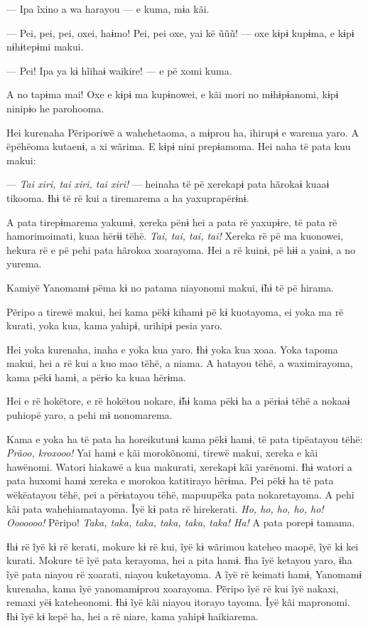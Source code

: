 --- Ipa ĩxino a wa harayou --- e kuma, mɨa kãi. 

--- Pei, pei, pei, oxei, haɨmo! Pei, pei oxe, yai kë ũũũ! --- oxe kɨpɨ
kupɨma, e kɨpɨ nɨhɨtepɨmi makui. 

--- Pei! Ipa ya kɨ hĩihaɨ waikire! --- e pë xomi kuma. 

A no tapɨma mai! Oxe e kɨpɨ ma kupɨnowei, e kãi mori no mɨhɨpɨanomi,
kɨpɨ ninipɨo he parohooma. 

Hei kurenaha Pẽriporiwë a wahehetaoma, a mɨprou ha, ihirupɨ e warema
yaro. A ëpëhëoma kutaenɨ, a xi wãrima. E kɨpɨ nini prepɨamoma. Hei naha
të pata kuu makui:

--- \textit{Tai xiri, tai xiri, tai xiri!} --- heinaha të pë xerekapɨ pata
hãrokaɨ kuaaɨ tikooma. Ɨhɨ të rë kui a tiremarema a ha yaxuprapërɨnɨ. 

A pata tirepɨmarema yakumɨ, xereka pënɨ hei a pata rë yaxupɨre, të pata
rë hamorimoimati, kuaa hërɨɨ tëhë. \textit{Tai, tai, tai, tai!} Xereka rë pë ma
kuonowei, hekura rë e pë pehi pata hãrokoa xoarayoma. Hei a rë kuinɨ, pë
hɨɨ a yainɨ, a no yurema. 

Kamiyë Yanomamɨ pëma kɨ no patama niayonomi makui, ɨ̃hɨ të pë hirama. 

Pẽripo a tirewë makui, hei kama pëkɨ kihamɨ pë kɨ kuotayoma, ei yoka ma
rë kurati, yoka kua, kama yahipɨ, urihipɨ pesia yaro. 

Hei yoka kurenaha, inaha e yoka kua yaro. Ɨhɨ yoka kua xoaa. Yoka tapoma
makui, hei a rë kui a kuo mao tëhë, a niama. A hatayou tëhë, a
waximirayoma, kama pëkɨ hamɨ, a përɨo ka kuaa hërɨma. 

Hei e rë hokëtore, e rë hokëtou nokare, ɨ̃hɨ kama pëkɨ ha a përɨaɨ tëhë a
nokaaɨ puhiopë yaro, a pehi mɨ nonomarema. 

Kama e yoka ha të pata ha horeikutunɨ kama pëkɨ hamɨ, të pata tipëatayou
tëhë: \textit{Prãoo, kroxooo!} Yai hamɨ e kãi morokõnomi, tirewë makui, xereka e
kãi hawënomi. Watori hiakawë a kua makurati, xerekapɨ kãi yarënomi. Ɨhɨ
watori a pata huxomi hamɨ xereka e morokoa katitirayo hërɨma. Pei pëkɨ
ha të pata wëkëatayou tëhë, pei a përɨatayou tëhë, mapuupëka pata
nokaretayoma. A pehi kãi pata wahehiamatayoma. Ĩyë kɨ pata rë
hirekerati. \textit{Ho, ho, ho, ho, ho! Ooooooo!} Pẽripo! \textit{Taka, taka, taka, taka,
taka, taka! Ha!} A pata porepɨ tamama. 

Ɨhɨ rë ĩyë kɨ rë kerati, mokure kɨ rë kui, ĩyë kɨ wãrimou kateheo maopë,
ĩyë kɨ kei kurati. Mokure të ĩyë pata kerayoma, hei a pita hamɨ. Ɨha ĩyë
ketayou yaro, ɨha ĩyë pata niayou rë xoarati, niayou kuketayoma. A ĩyë
rë keimati hamɨ, Yanomamɨ kurenaha, kama ĩyë yanomamɨprou xoarayoma.
Pẽripo ĩyë rë kui ĩyë nakaxi, remaxi yëɨ kateheonomi. Ɨhɨ ĩyë kãi niayou
itorayo tayoma. Ĩyë kãi mapronomi. Ɨhɨ ĩyë kɨ kepë ha, hei a rë niare,
kama yahipɨ haikiarema. 

